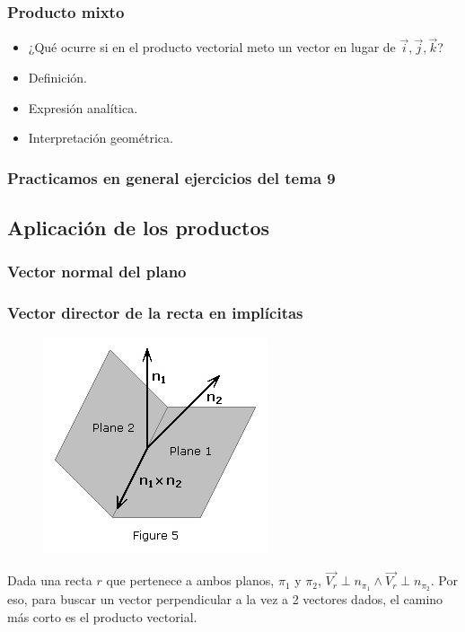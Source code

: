 \subsubsection{Producto mixto}

\begin{itemize}
  \item ¿Qué ocurre si en el producto vectorial meto un vector en lugar de $\vec{i},\vec{j},\vec{k}$?
  \item Definición.
  \item Expresión analítica.
  \item Interpretación geométrica. 
\end{itemize}

\subsubsection{Practicamos en general ejercicios del tema 9}

\subsection{Aplicación de los productos}

\subsubsection{Vector normal del plano}

\subsubsection{Vector director de la recta en implícitas}

\begin{figure}[hbtp]
\centering
\includegraphics{img/directorrectaimplicitas.jpg}
\end{figure}

Dada una recta $r$ que pertenece a ambos planos, $\pi_1$ y $\pi_2$, $\vec{V_r}\perp n_{\pi_1} \wedge \vec{V_r}\perp n_{\pi_2}$. Por eso, para buscar un vector perpendicular a la vez a 2 vectores dados, el camino más corto es el producto vectorial.

